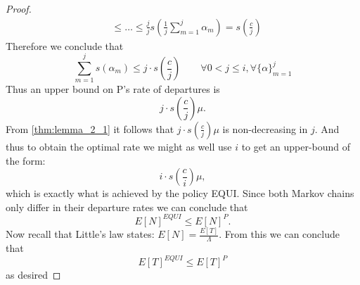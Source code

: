 \begin{proof}
\begin{align*}
        &\leq \dots \leq \frac{j}{j} s(\frac{1}{j} \sum_{m=1}^j\alpha_m) = s(\frac{c}{j})
    \end{align*}
    Therefore we conclude that $$\sum_{m=1}^j s (\alpha_m) \leq j\cdot s(\frac{c}{j}) \qquad \forall 0 < j \leq i, \forall \{\alpha\}_{m=1}^j$$
    Thus an upper bound on P's rate of departures is $$j\cdot s(\frac{c}{j}) \mu.$$ From \autoref{thm:lemma_2_1} it follows that $j\cdot s(\frac{c}{j}) \mu$ is non-decreasing in $j$. And thus to obtain the optimal rate we might as well use $i$ to get an upper-bound of the form:
    $$i\cdot s(\frac{c}{i}) \mu,$$
    which is exactly what is achieved by the policy EQUI. Since both Markov chains only differ in their departure rates we can conclude that
    $$E[N]^{EQUI} \leq E[N]^P.$$
    Now recall that Little's law states: $E[N] = \frac{E[T]}{\Lambda}$. From this we can conclude that
    $$E[T]^{EQUI} \leq E[T]^P$$
    as desired
\end{proof}
